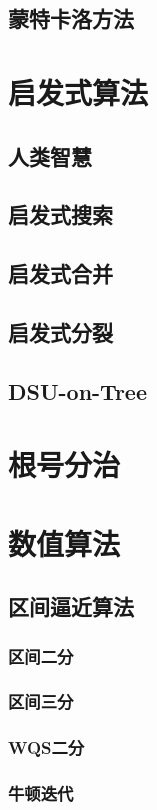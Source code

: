 \documentclass[12pt,a4paper]{article}
\begin{document}
\subsection{蒙特卡洛方法}

\newpage
\section{启发式算法}
\subsection{人类智慧} %
\subsection{启发式搜索}
\subsection{启发式合并}
\subsection{启发式分裂}
\subsection{DSU-on-Tree}

\newpage
\section{根号分治}

\newpage
\section{数值算法}
\subsection{区间逼近算法}
\subsubsection{区间二分}
\subsubsection{区间三分}
\subsubsection{WQS二分}
\subsubsection{牛顿迭代}
\end{document}
